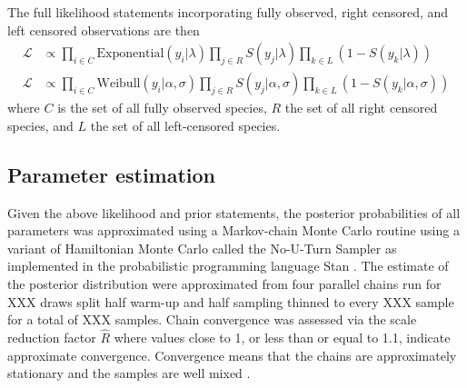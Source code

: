 \documentclass[12pt,letterpaper]{article}
\begin{document}
The full likelihood statements incorporating fully observed, right censored, and left censored observations are then
\begin{equation}
  \begin{aligned}
    \mathcal{L} &\propto \prod_{i \in C} \mathrm{Exponential}(y_{i} | \lambda) \prod_{j \in R} S(y_{j} | \lambda) \prod_{k \in L} \left(1 - S(y_{k} | \lambda)\right) \\
    \mathcal{L} &\propto \prod_{i \in C} \mathrm{Weibull}(y_{i} | \alpha, \sigma) \prod_{j \in R} S(y_{j} | \alpha, \sigma) \prod_{k \in L} \left(1 - S(y_{k} | \alpha, \sigma)\right)
  \end{aligned}
  \label{eq:censored_likelihood}
\end{equation}
where \(C\) is the set of all fully observed species, \(R\) the set of all right censored species, and \(L\) the set of all left-censored species.


\subsection{Parameter estimation}
Given the above likelihood and prior statements, the posterior probabilities of all parameters was approximated using a Markov-chain Monte Carlo routine using a variant of Hamiltonian Monte Carlo called the No-U-Turn Sampler \citep{Hoffman2014} as implemented in the probabilistic programming language Stan \citep{stan-software:2014}. The estimate of the posterior distribution were approximated from four parallel chains run for XXX draws split half warm-up and half sampling thinned to every XXX sample for a total of XXX samples. Chain convergence was assessed via the scale reduction factor \(\hat{R}\) where values close to 1, or less than or equal to 1.1, indicate approximate convergence. Convergence means that the chains are approximately stationary and the samples are well mixed \citep{Gelman2013d}.


\end{document}
